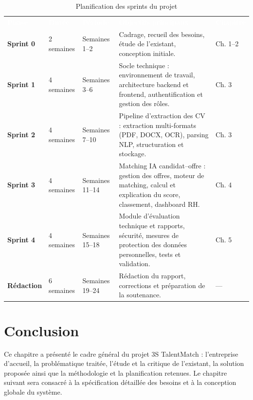 \documentclass[12pt,a4paper]{report}
\begin{document}
\begin{table}[H]
\centering
\caption{Planification des sprints du projet}
\label{tab:planification}
\small
\begin{tabularx}{\textwidth}{p{1.8cm} p{2.1cm} p{2.6cm} X p{1.6cm}}
\rowcolor{tabheader}
\textcolor{white}{\textbf{Phase}} & \textcolor{white}{\textbf{Durée}} & \textcolor{white}{\textbf{Période}} & \textcolor{white}{\textbf{Objectifs principaux}} & \textcolor{white}{\textbf{Chapitre}} \\
\textbf{Sprint 0} & 2 semaines & Semaines 1--2 & Cadrage, recueil des besoins, étude de l'existant, conception initiale. & Ch. 1--2 \\
\rowcolor{tabalt}
\textbf{Sprint 1} & 4 semaines & Semaines 3--6 & Socle technique : environnement de travail, architecture backend et frontend, authentification et gestion des rôles. & Ch. 3 \\
\textbf{Sprint 2} & 4 semaines & Semaines 7--10 & Pipeline d'extraction des CV : extraction multi-formats (PDF, DOCX, OCR), parsing NLP, structuration et stockage. & Ch. 3 \\
\rowcolor{tabalt}
\textbf{Sprint 3} & 4 semaines & Semaines 11--14 & Matching IA candidat--offre : gestion des offres, moteur de matching, calcul et explication du score, classement, dashboard RH. & Ch. 4 \\
\textbf{Sprint 4} & 4 semaines & Semaines 15--18 & Module d'évaluation technique et rapports, sécurité, mesures de protection des données personnelles, tests et validation. & Ch. 5 \\
\rowcolor{tabalt}
\textbf{Rédaction} & 6 semaines & Semaines 19--24 & Rédaction du rapport, corrections et préparation de la soutenance. & --- \\
\bottomrule
\end{tabularx}
\end{table}

\section{Conclusion}

Ce chapitre a présenté le cadre général du projet 3S TalentMatch : l'entreprise d'accueil, la problématique traitée, l'étude et la critique de l'existant, la solution proposée ainsi que la méthodologie et la planification retenues. Le chapitre suivant sera consacré à la spécification détaillée des besoins et à la conception globale du système.
\end{document}
